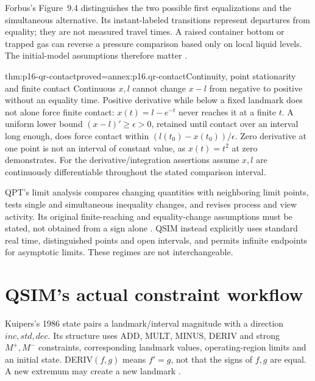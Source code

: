 Forbus's Figure~9.4 distinguishes the two possible first equalizations and
the simultaneous alternative. Its instant-labeled transitions represent
departures from equality; they are not measured travel times. A raised
container bottom or trapped gas can reverse a pressure comparison based
only on local liquid levels. The initial-model assumptions therefore matter
\cite[pp.~363--365, Figure~9.4]{Forbus2008QualitativeModeling}.

\begin{hbtheorem}{thm:p16-qr-contact}{proved=annex:p16.qr-contact}{Continuity, point stationarity and finite contact}
Continuous \(x,l\) cannot change \(x-l\) from negative to positive
without an equality time. Positive derivative while below a fixed landmark
does not alone force finite contact: \(x(t)=l-e^{-t}\) never reaches it
at a finite \(t\). A uniform lower bound \((x-l)'\ge\epsilon>0\),
retained until contact over an interval long enough, does force contact within
\((l(t_0)-x(t_0))/\epsilon\). Zero derivative at one point is not an
interval of constant value, as \(x(t)=t^2\) at zero demonstrates.
For the derivative/integration assertions assume \(x,l\) are continuously
differentiable throughout the stated comparison interval.
\end{hbtheorem}

QPT's limit analysis compares changing quantities with neighboring limit
points, tests single and simultaneous inequality changes, and revises process
and view activity. Its original finite-reaching and equality-change assumptions
must be stated, not obtained from a sign alone
\cite[sec.~3.6.4 and footnote~13]{Forbus1984QPT}. QSIM instead explicitly
uses standard real time, distinguished points and open intervals, and permits
infinite endpoints for asymptotic limits. These regimes are not interchangeable.

\section{QSIM's actual constraint workflow}
\label{sec:p16-qr-qsim}

Kuipers's 1986 state pairs a landmark/interval magnitude with a direction
\(inc,std,dec\). Its structure uses ADD, MULT, MINUS, DERIV and strong
\(M^+,M^-\) constraints, corresponding landmark values, operating-region
limits and an initial state. DERIV\((f,g)\) means \(f'=g\), not that
the signs of \(f,g\) are equal. A new extremum may create a new landmark
\cite[secs.~2--4]{Kuipers1986QualitativeSimulation}.

